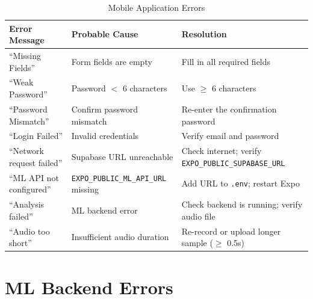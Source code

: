\documentclass[10pt, a4paper, oneside]{report}
\begin{document}
\begin{table}[H]
\centering
\caption{Mobile Application Errors}
\label{tab:mobile-errors}
\begin{tabularx}{\textwidth}{p{3.8cm} p{4.2cm} X}
  \toprule
  \textbf{Error Message} & \textbf{Probable Cause} & \textbf{Resolution} \\
  \midrule
  ``Missing Fields''         & Form fields are empty               & Fill in all required fields \\
  ``Weak Password''          & Password $<$ 6 characters           & Use $\geq$ 6 characters \\
  ``Password Mismatch''      & Confirm password mismatch           & Re-enter the confirmation password \\
  ``Login Failed''           & Invalid credentials                 & Verify email and password \\
  ``Network request failed'' & Supabase URL unreachable            & Check internet; verify \texttt{EXPO\_PUBLIC\_SUPABASE\_URL} \\
  ``ML API not configured''  & \texttt{EXPO\_PUBLIC\_ML\_API\_URL} missing & Add URL to \texttt{.env}; restart Expo \\
  ``Analysis failed''        & ML backend error                    & Check backend is running; verify audio file \\
  ``Audio too short''        & Insufficient audio duration         & Re-record or upload longer sample ($\geq$ 0.5s) \\
  \bottomrule
\end{tabularx}
\end{table}

\section{ML Backend Errors}
\end{document}
